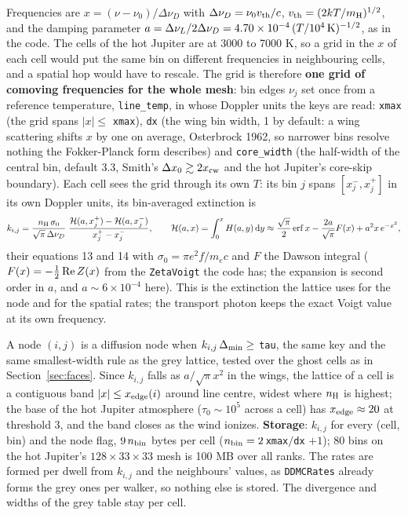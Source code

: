 \documentclass[11pt]{article}
\newcommand{\key}[1]{\texttt{#1}}
\newcommand{\dd}{\mathrm{d}}
\begin{document}
Frequencies are $x = (\nu - \nu_0)/\Delta\nu_D$ with $\Delta\nu_D = \nu_0 v_{\rm th}/c$,
$v_{\rm th} = (2kT/m_{\rm H})^{1/2}$, and the damping parameter $a =
\Delta\nu_L/2\Delta\nu_D = 4.70\times10^{-4}\,(T/10^4\,{\rm K})^{-1/2}$, as in the code.
The cells of the hot Jupiter are at 3000 to 7000 K, so a grid in the $x$ of each cell
would put the same bin on different frequencies in neighbouring cells, and a spatial
hop would have to rescale.  The grid is therefore \textbf{one grid of comoving
frequencies for the whole mesh}: bin edges $\nu_j$ set once from a reference
temperature, \key{line\_temp}, in whose Doppler units the keys are read: \key{xmax}
(the grid spans $|x| \le$ \key{xmax}), \key{dx} (the wing bin width, 1 by default: a
wing scattering shifts $x$ by one on average, Osterbrock 1962, so narrower bins resolve
nothing the Fokker-Planck form describes) and \key{core\_width} (the half-width of the
central bin, default 3.3, Smith's $\Delta x_0 \gtrsim 2x_{\rm cw}$ and the hot
Jupiter's core-skip boundary).  Each cell sees the grid through its own $T$: its bin
$j$ spans $[x_j^-, x_j^+]$ in its own Doppler units, its bin-averaged extinction is
\begin{equation}
k_{i,j} = \frac{n_{\rm H}\,\sigma_0}{\sqrt{\pi}\,\Delta\nu_D}\;
\frac{\mathcal{H}(a, x_j^+) - \mathcal{H}(a, x_j^-)}{x_j^+ - x_j^-},\qquad
\mathcal{H}(a,x) = \int_0^x H(a,y)\,\dd y
\approx \frac{\sqrt{\pi}}{2}\,{\rm erf}\,x - \frac{2a}{\sqrt\pi}F(x) + a^2 x\,e^{-x^2},
\label{eq:kbin}
\end{equation}
their equations 13 and 14 with $\sigma_0 = \pi e^2 f/m_e c$ and $F$ the Dawson
integral ($F(x) = -\tfrac12\,{\rm Re}\,Z(x)$ from the \texttt{ZetaVoigt} the code has;
the expansion is second order in $a$, and $a \sim 6\times10^{-4}$ here).  This is the
extinction the lattice uses for the node and for the spatial rates; the transport
photon keeps the exact Voigt value at its own frequency.

A node $(i,j)$ is a diffusion node when $k_{i,j}\,\Delta_{\rm min} \ge$ \key{tau}, the
same key and the same smallest-width rule as the grey lattice, tested over the ghost
cells as in Section~\ref{sec:faces}.  Since $k_{i,j}$ falls as $a/\sqrt\pi x^2$ in the
wings, the lattice of a cell is a contiguous band $|x| \le x_{\rm edge}(i)$ around line
centre, widest where $n_{\rm H}$ is highest; the base of the hot Jupiter atmosphere
($\tau_0 \sim 10^5$ across a cell) has $x_{\rm edge} \approx 20$ at threshold 3, and
the band closes as the wind ionizes.  \textbf{Storage}: $k_{i,j}$ for every (cell, bin)
and the node flag, $9\,n_{\rm bin}$ bytes per cell ($n_{\rm bin} = 2\,$\key{xmax}$/$\key{dx}
$+ 1$); 80 bins on the hot Jupiter's $128\times33\times33$ mesh is 100 MB over all
ranks.  The rates are formed per dwell from $k_{i,j}$ and the neighbours' values, as
\texttt{DDMCRates} already forms the grey ones per walker, so nothing else is stored.
The divergence and widths of the grey table stay per cell.
\end{document}
